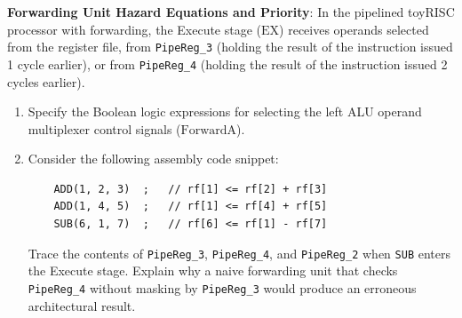 \begin{problem}
\textbf{Forwarding Unit Hazard Equations and Priority}:
In the pipelined toyRISC processor with forwarding, the Execute stage ($\text{EX}$) receives operands selected from the register file, from \texttt{PipeReg\_3} (holding the result of the instruction issued 1 cycle earlier), or from \texttt{PipeReg\_4} (holding the result of the instruction issued 2 cycles earlier).
\begin{enumerate}
    \item Specify the Boolean logic expressions for selecting the left ALU operand multiplexer control signals ($\text{ForwardA}$).
    \item Consider the following assembly code snippet:
\begin{verbatim}
    ADD(1, 2, 3)  ;   // rf[1] <= rf[2] + rf[3]
    ADD(1, 4, 5)  ;   // rf[1] <= rf[4] + rf[5]
    SUB(6, 1, 7)  ;   // rf[6] <= rf[1] - rf[7]
\end{verbatim}
Trace the contents of \texttt{PipeReg\_3}, \texttt{PipeReg\_4}, and \texttt{PipeReg\_2} when \texttt{SUB} enters the Execute stage. Explain why a naive forwarding unit that checks \texttt{PipeReg\_4} without masking by \texttt{PipeReg\_3} would produce an erroneous architectural result.
\end{enumerate}


\end{problem}
